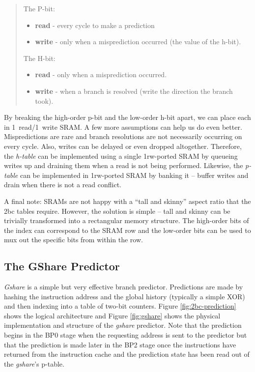 \begin{quote}
The P-bit:
\begin{itemize}
\item {\bf read} - every cycle to make a prediction
\item {\bf write} - only when a misprediction occurred (the value of the h-bit).
\end{itemize}

The H-bit:

\begin{itemize}
\item {\bf read} - only when a misprediction occurred.
\item {\bf write} - when a branch is resolved (write the direction the branch took).
\end{itemize}
\end{quote}

By breaking the high-order p-bit and the low-order h-bit apart, we can place each in 1~read/1~write SRAM. A few more assumptions can help us do even better. Mispredictions are rare and branch resolutions are not necessarily occurring on every cycle. Also, writes can be delayed or even dropped altogether. Therefore, the {\em h-table} can be implemented using a single 1rw-ported SRAM by queueing writes up and draining them when a read is not being performed. Likewise, the {\em p-table} can be implemented in 1rw-ported SRAM by banking it -- buffer writes and drain when there is not a read conflict.


A final note: SRAMs are not happy with a ``tall and skinny'' aspect ratio that the 2bc tables require. However, the solution is simple -- tall and skinny can be trivially transformed into a rectangular memory structure.  The high-order bits of the index can correspond to the SRAM row and the low-order bits can be used to mux out the specific bits from within the row. 

\subsection{The GShare Predictor}

{\em Gshare} is a simple but very effective branch predictor. Predictions are made by hashing the instruction address and the global history (typically a simple XOR) and then indexing into a table of two-bit counters.  Figure \ref{fig:2bc-prediction} shows the logical architecture and Figure \ref{fig:gshare} shows the physical implementation and structure of the {\em gshare} predictor. Note that the prediction begins in the BP0 stage when the requesting address is sent to the predictor but that the prediction is made later in the BP2 stage once the instructions have returned from the instruction cache and the prediction state has been read out of the {\em gshare}'s p-table.


